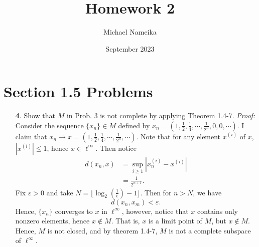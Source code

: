 \documentclass{article}
\title{Homework 2}
\author{Michael Nameika}
\date{September 2023}
\begin{document}
\maketitle

\section*{Section 1.5 Problems}
\begin{itemize}
    \item[\textbf{4}.] Show that $M$ in Prob. 3 is not complete by applying Theorem 1.4-7.
    \newline\newline
    \textit{Proof:} Consider the sequence $\{x_n\} \in M$ defined by $x_n = \left(1, \tfrac{1}{2}, \tfrac{1}{4}, \cdots, \tfrac{1}{2^n}, 0, 0, \cdots\right)$. I claim that $x_n \to x = \left(1, \tfrac{1}{2}, \tfrac{1}{4}, \cdots, \tfrac{1}{2^n}, \cdots\right)$. Note that for any element $x^{(i)}$ of $x$, $|x^{(i)}| \leq 1$, hence $x \in \ell^{\infty}$. Then notice
    \begin{align*}
        d(x_n,x) &= \sup_{i \geq 1}|x_n^{(i)} - x^{(i)}|\\
        &= \frac{1}{2^{n+1}}.
    \end{align*}
    Fix $\varepsilon > 0$ and take $N = \lfloor \log_2\left(\tfrac{1}{\epsilon}\right) - 1\rfloor$. Then for $n>N$, we have
    \[d(x_n,x_m) < \varepsilon.\]
    Hence, $\{x_n\}$ converges to $x$ in $\ell^{\infty}$, however, notice that $x$ contains only nonzero elements, hence $x \notin M$. That is, $x$ is a limit point of $M$, but $x \notin M$. Hence, $M$ is not closed, and by theorem 1.4-7, $M$ is not a complete subspace of $\ell^{\infty}$.
\end{itemize}   
\end{document}
